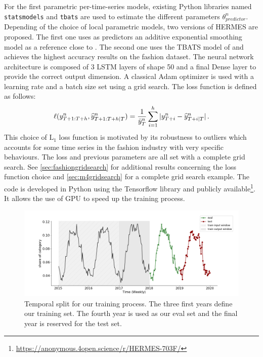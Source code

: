 \documentclass[10pt]{article} %
\newcommand{\ts}{y}
\newcommand{\tspred}{\widehat{\ts}}
\newcommand{\statparam}{\theta_{predictor}}
\newcommand{\lag}{h}
\newcommand{\meants}{\Bar{\ts}}
\begin{document}
For the first parametric per-time-series models, existing Python  libraries named \texttt{statsmodels} and  \texttt{tbats} are used to estimate the different parameters $\statparam^n$.  Depending of the choice of local parametric models, two versions of HERMES are proposed. The first one uses as predictors an additive exponential smoothing model as a reference close to \citet{smyl2020}. The second one uses the TBATS model of \citet{alysha2011} and  achieves the highest accuracy results on the fashion dataset. The neural network architecture is composed of 3 LSTM layers of shape 50 and a final Dense layer to provide the correct output dimension. A classical Adam optimizer is used with a learning rate and a batch size set using a grid search. The loss function is defined as follows:
$$
\ell(\ts^n_{T+1:T+\lag},\tspred^n_{T+1:T+\lag|T}) = \frac{1}{\meants^n_T}\sum_{i=1}^{\lag}|\ts^n_{T+i} - \tspred^n_{T+i|T}|\,.
$$
This choice of $\mathrm{L}_1$ loss function is motivated by its robustness to outliers which accounts for some time series in the fashion industry with very specific behaviours. The loss and previous parameters are all set with a complete grid search. See \ref{sec:fashiongridsearch} for additional results concerning the loss function choice and \ref{sec:m4gridsearch} for a complete grid search example. The code is developed in Python using the Tensorflow library and publicly available\footnote[1]{\url{https://anonymous.4open.science/r/HERMES-703F/}}. It allows the use of GPU to speed up the training process.



\begin{figure}
  \centering
    \includegraphics[width=1.\linewidth]{train_eval_test_set}
  \caption{Temporal split for our training process. The three first years define our training set. The fourth year is used as our eval set and the final year is reserved for the test set.}
\label{fig:train_eval_test_set}
\end{figure}
\end{document}
